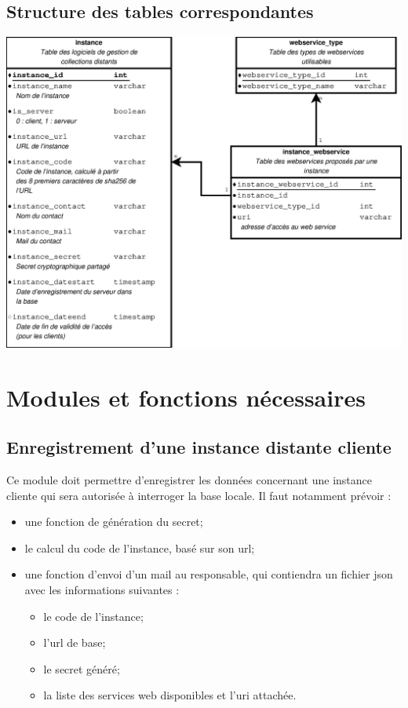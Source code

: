 \subsection{Structure des tables correspondantes}

\includegraphics[width=\linewidth]{images/tables_declaration_instances}

\section{Modules et fonctions nécessaires}
\subsection{Enregistrement d'une instance distante cliente}
\label{dist_record}
Ce module doit permettre d'enregistrer les données concernant une instance cliente qui sera autorisée à interroger la base locale. Il faut notamment prévoir :
\begin{itemize}
\item une fonction de génération du secret;
\item le calcul du code de l'instance, basé sur son url;
\item une fonction d'envoi d'un mail au responsable, qui contiendra un fichier json avec les informations suivantes :
\begin{itemize}
\item le code de l'instance;
\item l'url de base;
\item le secret généré;
\item la liste des services web disponibles et l'uri attachée.
\end{itemize}
\end{itemize}

